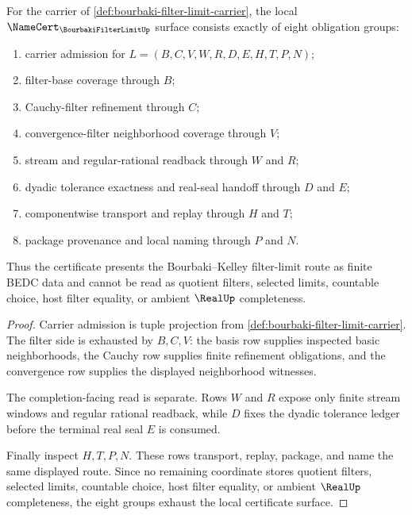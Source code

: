 \begin{theorem}
\label{thm:bourbaki-filter-limit-namecert-obligations}
For the carrier of \autoref{def:bourbaki-filter-limit-carrier}, the local $\NameCert_{\BourbakiFilterLimitUp}$ surface consists exactly of eight obligation groups:
\begin{enumerate}
\item carrier admission for $L=(B,C,V,W,R,D,E,H,T,P,N)$;
\item filter-base coverage through $B$;
\item Cauchy-filter refinement through $C$;
\item convergence-filter neighborhood coverage through $V$;
\item stream and regular-rational readback through $W$ and $R$;
\item dyadic tolerance exactness and real-seal handoff through $D$ and $E$;
\item componentwise transport and replay through $H$ and $T$;
\item package provenance and local naming through $P$ and $N$.
\end{enumerate}
Thus the certificate presents the Bourbaki--Kelley filter-limit route as finite BEDC data and cannot be read as quotient filters, selected limits, countable choice, host filter equality, or ambient $\RealUp$ completeness.
\end{theorem}
\begin{proof}
Carrier admission is tuple projection from \autoref{def:bourbaki-filter-limit-carrier}. The filter side is exhausted by $B,C,V$: the basis row supplies inspected basic neighborhoods, the Cauchy row supplies finite refinement obligations, and the convergence row supplies the displayed neighborhood witnesses.

The completion-facing read is separate. Rows $W$ and $R$ expose only finite stream windows and regular rational readback, while $D$ fixes the dyadic tolerance ledger before the terminal real seal $E$ is consumed.

Finally inspect $H,T,P,N$. These rows transport, replay, package, and name the same displayed route. Since no remaining coordinate stores quotient filters, selected limits, countable choice, host filter equality, or ambient $\RealUp$ completeness, the eight groups exhaust the local certificate surface.
\end{proof}

